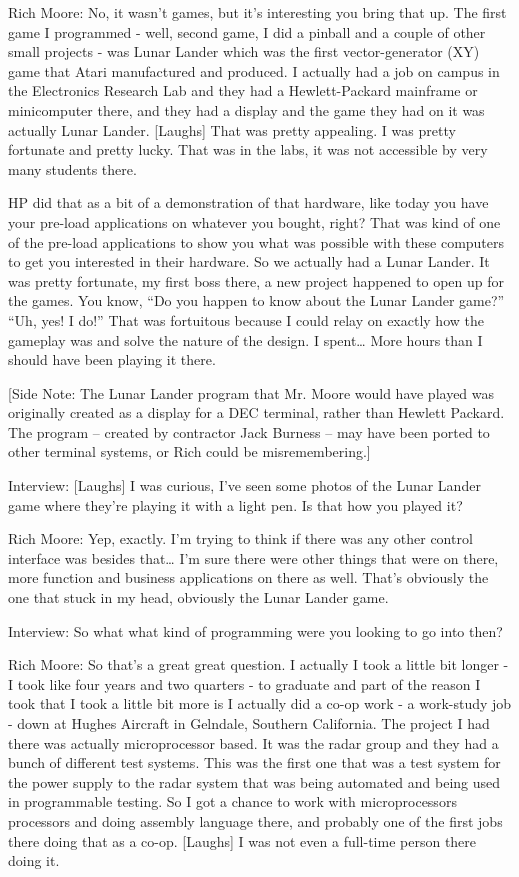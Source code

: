 \textcolor{interviewee}{Rich Moore:} No, it wasn’t games, but it’s interesting you bring that up. The first game I programmed - well, second game, I did a pinball and a couple of other small projects - was Lunar Lander which was the first vector-generator (XY) game that Atari manufactured and produced. I actually had a job on campus in the Electronics Research Lab and they had a Hewlett-Packard mainframe or minicomputer there, and they had a display and the game they had on it was actually Lunar Lander. [Laughs] That was pretty appealing. I was pretty fortunate and pretty lucky. That was in the labs, it was not accessible by very many students there.

HP did that as a bit of a demonstration of that hardware, like today you have your pre-load applications on whatever you bought, right? That was kind of one of the pre-load applications to show you what was possible with these computers to get you interested in their hardware. So we actually had a Lunar Lander. It was pretty fortunate, my first boss there, a new project happened to open up for the games. You know, “Do you happen to know about the Lunar Lander game?” “Uh, yes! I do!” That was fortuitous because I could relay on exactly how the gameplay was and solve the nature of the design. I spent… More hours than I should have been playing it there.

[Side Note: The Lunar Lander program that Mr. Moore would have played was originally created as a display for a DEC terminal, rather than Hewlett Packard. The program – created by contractor Jack Burness – may have been ported to other terminal systems, or Rich could be misremembering.]

Interview: [Laughs] I was curious, I've seen some photos of the Lunar Lander game where they're playing it with a light pen. Is that how you played it?

\textcolor{interviewee}{Rich Moore:} Yep, exactly. I’m trying to think if there was any other control interface was besides that… I’m sure there were other things that were on there, more function and business applications on there as well. That’s obviously the one that stuck in my head, obviously the Lunar Lander game.

Interview: So what what kind of programming were you looking to go into then?

\textcolor{interviewee}{Rich Moore:} So that's a great great question. I actually I took a little bit longer - I took like four years and two quarters - to graduate and part of the reason I took that I took a little bit more is I actually did a co-op work - a work-study job - down at Hughes Aircraft in Gelndale, Southern California. The project I had there was actually microprocessor based. It was the radar group and they had a bunch of different test systems. This was the first one that was a test system for the power supply to the radar system that was being automated and being used in programmable testing. So I got a chance to work with microprocessors processors and doing assembly language there, and probably one of the first jobs there doing that as a co-op. [Laughs] I was not even a full-time person there doing it.

